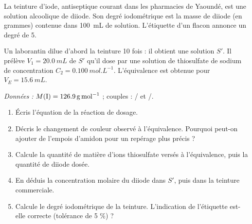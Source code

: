\documentclass[11pt]{article}
\newcommand{\cle}[1]{{\popxbold\color{popdark}#1}}
\begin{document}
\begin{exercice}
La teinture d'iode, antiseptique courant dans les pharmacies de Yaoundé, est une solution alcoolique de diiode. Son \cle{degré iodométrique} est la masse de diiode (en grammes) contenue dans \SI{100}{mL} de solution. L'étiquette d'un flacon annonce un degré de 5.

Un laborantin dilue d'abord la teinture 10 fois : il obtient une solution $S'$. Il prélève $V_1 = \SI{20,0}{mL}$ de $S'$ qu'il dose par une solution de thiosulfate de sodium de concentration $C_2 = \SI{0,100}{mol.L^{-1}}$. L'équivalence est obtenue pour $V_E = \SI{15,6}{mL}$.

\emph{Données :} $M(\ce{I}) = \SI{126,9}{g.mol^{-1}}$ ; couples : / et /.

\begin{enumerate}
\item Écris l'équation de la réaction de dosage.
\item Décris le changement de couleur observé à l'équivalence. Pourquoi peut-on ajouter de l'empois d'amidon pour un repérage plus précis ?
\item Calcule la quantité de matière d'ions thiosulfate versés à l'équivalence, puis la quantité de diiode dosée.
\item En déduis la concentration molaire du diiode dans $S'$, puis dans la teinture commerciale.
\item Calcule le degré iodométrique de la teinture. L'indication de l'étiquette est-elle correcte (tolérance de 5 \%) ?
\end{enumerate}
\end{exercice}
\end{document}
